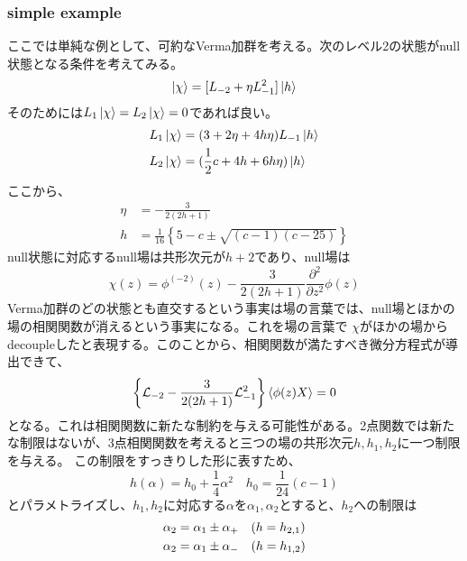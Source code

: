 \documentclass[11pt, aps, longbibliography]{article}
\numberwithin{equation}{section}
\begin{document}
        \subsubsection{simple example}
        ここでは単純な例として、可約なVerma加群を考える。次のレベル2の状態がnull状態となる条件を考えてみる。
        \begin{equation}\label{eq:minimal1-1}
            \ket{\chi} = [L_{-2} + \eta L_{-1}^2] \ket{h}
        \end{equation}
        そのためには$L_1\ket{\chi}=L_2\ket{\chi} = 0$であれば良い。
        \begin{align}\label{eq:minimal1-2}
            L_1\ket{\chi} &= (3+2\eta + 4h\eta)L_{-1}\ket{h} \\
            L_2\ket{\chi} &= (\frac{1}{2}c + 4h + 6h\eta)\ket{h} \notag 
        \end{align}
        ここから、
        \begin{align}\label{eq:minimal1-3}
            \eta &= -\frac{3}{2(2h+1)} \\
            h &= \frac{1}{16}\left\{ 5-c\pm \sqrt{(c-1)(c-25)} \right\}
        \end{align}
        null状態に対応するnull場は共形次元が$h+2$であり、null場は
        \begin{equation}\label{eq:minimal1-4}
            \chi(z) = \phi^{(-2)}(z) - \frac{3}{2(2h+1)} \frac{\partial^2}{\partial z^2}\phi(z)
        \end{equation}
        Verma加群のどの状態とも直交するという事実は場の言葉では、null場とほかの場の相関関数が消えるという事実になる。これを場の言葉で
        $\chi$がほかの場からdecoupleしたと表現する。このことから、相関関数が満たすべき微分方程式が導出できて、
        \begin{equation}\label{eq:minimal1-5}
            \left\{ \mathcal{L}_{-2} - \frac{3}{2(2h+1)}\mathcal{L}_{-1}^2 \right\} \expval{\phi(z)X} = 0
        \end{equation}
        となる。これは相関関数に新たな制約を与える可能性がある。2点関数では新たな制限はないが、3点相関関数を考えると三つの場の共形次元$h,h_1,h_2$に一つ制限を与える。
        この制限をすっきりした形に表すため、
        \begin{equation}\label{eq:minimal1-6}
            h(\alpha) = h_0 + \frac{1}{4}\alpha^2 \quad h_0 = \frac{1}{24}(c-1)
        \end{equation}
        とパラメトライズし、$h_1,h_2$に対応する$\alpha$を$\alpha_1,\alpha_2$とすると、$h_2$への制限は
        \begin{align}\label{eq:minimal1-7}
            \alpha_2 &= \alpha_1 \pm \alpha_+ \quad (h=h_{2,1}) \\
            \alpha_2 &= \alpha_1 \pm \alpha_- \quad (h=h_{1,2}) \notag
        \end{align}
\end{document}
